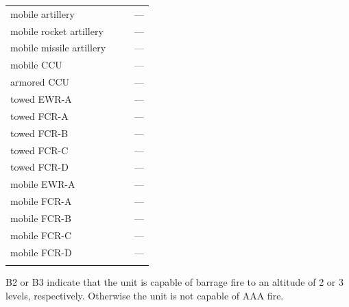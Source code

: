 \begin{tabularx}{0.5\linewidth}{Lccc}
mobile artillery&&&---\\
mobile rocket artillery&&&---\\
\addlinespace
mobile missile artillery&&&---\\
mobile CCU&&&---\\
armored CCU&&&---\\
\addlinespace
towed EWR-A&&&---\\
towed FCR-A&&&---\\
towed FCR-B&&&---\\
\addlinespace
towed FCR-C&&&---\\
towed FCR-D&&&---\\
mobile EWR-A&&&---\\
\addlinespace
mobile FCR-A&&&---\\
mobile FCR-B&&&---\\
mobile FCR-C&&&---\\
\addlinespace
mobile FCR-D&&&---\\
\addlinespace
\bottomrule
\end{tabularx}
\begin{tablenote}{0.5\linewidth}
 B2 or B3 indicate that the unit is capable of barrage fire to an altitude of 2 or 3 levels, respectively. Otherwise the unit is not capable of AAA fire.
\end{tablenote}
